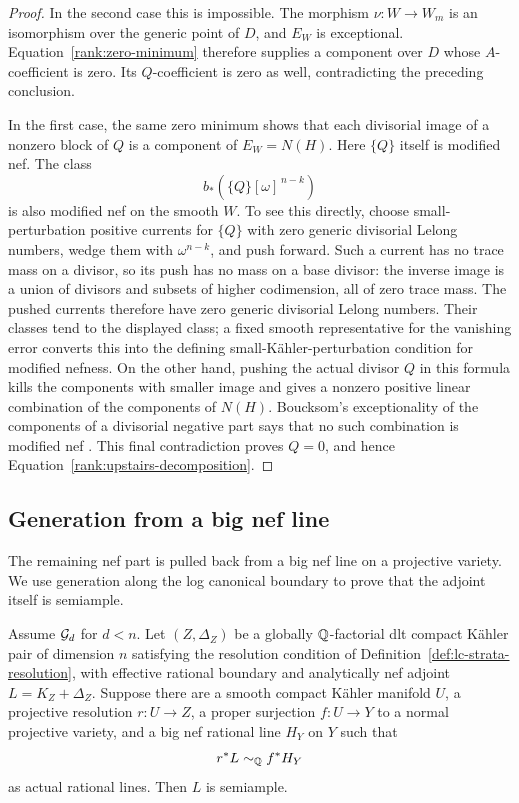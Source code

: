 \begin{proof}
In the second case this is impossible.  The morphism
\(\nu:W\to W_m\) is an isomorphism over the generic point of
\(D\), and \(E_W\) is exceptional.
Equation~\eqref{rank:zero-minimum} therefore supplies a component over
\(D\) whose \(A\)-coefficient is zero.  Its \(Q\)-coefficient is
zero as well, contradicting the preceding conclusion.

In the first case, the same zero minimum shows that each
divisorial image of a nonzero block of \(Q\) is a component of
\(E_W=N(H)\).  Here \(\{Q\}\) itself is modified nef.  The class
\[
                         b_*(\{Q\}[\omega]^{\,n-k})
\]
is also modified nef on the smooth \(W\).  To see this directly,
choose small-perturbation positive currents for \(\{Q\}\) with
zero generic divisorial Lelong numbers, wedge them with
\(\omega^{n-k}\), and push forward.  Such a current has no trace
mass on a divisor, so its push has no mass on a base divisor:
the inverse image is a union of divisors and subsets of higher
codimension, all of zero trace mass.  The pushed currents
therefore have zero generic divisorial Lelong numbers.  Their
classes tend to the displayed class; a fixed smooth representative
for the vanishing error converts this into the defining
small-Kähler-perturbation condition for modified nefness.
On the other hand, pushing the actual divisor \(Q\) in this
formula kills the components with smaller image and gives a
nonzero positive linear combination of the components of \(N(H)\).
Boucksom's exceptionality of the components of a divisorial negative
part says that no such combination is modified nef
\cite[Definition~3.10 and Theorem~3.12]{Boucksom2004}.
This final contradiction proves \(Q=0\),
and hence Equation~\eqref{rank:upstairs-decomposition}.
\end{proof}

\subsection{Generation from a big nef line}

The remaining nef part is pulled back from a big nef line on a
projective variety.  We use generation along the log canonical boundary
to prove that the adjoint itself is semiample.

\begin{proposition}
\label{rank:big-nef-generation}
Assume \(\mathcal G_d\) for \(d<n\).  Let \((Z,\Delta_Z)\) be a
globally \(\mathbb Q\)-factorial dlt compact Kähler pair of dimension \(n\)
satisfying the resolution condition of
Definition~\ref{def:lc-strata-resolution}, with effective rational boundary
and analytically nef adjoint
\(L=K_Z+\Delta_Z\).  Suppose there are a smooth compact Kähler
manifold \(U\), a projective resolution \(r:U\to Z\), a proper
surjection \(f:U\to Y\) to a normal projective variety, and a
big nef rational line \(H_Y\) on \(Y\) such that
\begin{equation}
                        r^*L\sim_{\mathbb Q}f^*H_Y
\label{rank:big-pullback}
\end{equation}
as actual rational lines.  Then \(L\) is semiample.
\end{proposition}

